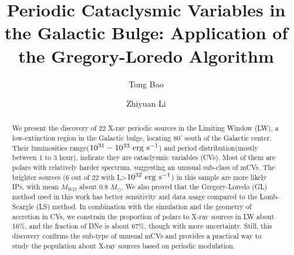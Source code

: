 \documentclass[twoside,twocolumn]{aastex63}
\begin{document}
\title{Periodic Cataclysmic Variables in the Galactic Bulge: Application of the Gregory-Loredo Algorithm}


\author{Tong Bao}
\author{Zhiyuan Li}
\begin{abstract}
We present the discovery of 22 X-ray periodic sources in the Limiting Window (LW), a low-extinction region in the Galactic bulge, locating 80' south of the Galactic center. Their luminosities range(${\rm 10^{31}-10^{33} ~erg ~ s^{-1}}$) and period distribution(mostly between 1 to 3 hour), indicate they are cataclysmic variables (CVs). Most of them are polars with relatively harder spectrum, suggesting an unusual sub-class of mCVs.
The brighter sources (6 out of 22 with L>$\rm 10^{32} ~erg~s^{-1}$) in this sample are more likely IPs, with mean $M_{WD}$ about 0.8 $M_\odot$.
We also proved that the Gregory-Loredo (GL) method used in this work has better sensitivity and data usage compared to the Lomb-Scargle (LS) method. In combination with the simulation and the geometry of accretion in CVs, we constrain the proportion of polars to X-ray sources in LW about 16\%, and the fraction of DNe is about 67\%, though with more uncertainty. Still, this discovery confirms the sub-type of unusual mCVs and provides a practical way to study the population about X-ray sources based on periodic modulation.
\end{abstract}

\end{document}
